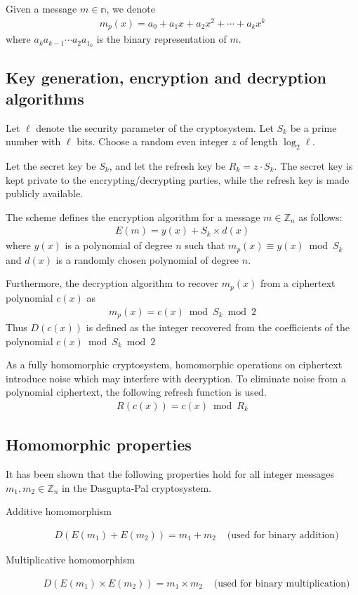 Given a message $m \in \mathbb{n}$, we denote
\begin{align*}
		m_p(x) = a_0 + a_1x + a_2x^2 + \cdots + a_kx^k
\end{align*}
where $a_ka_{k-1}\cdots a_2a_1_0$ is the binary representation of $m$.
\subsection{Key generation, encryption and decryption algorithms}
Let $\ell$ denote the security parameter of the cryptosystem.
Let $S_k$ be a prime number with $\ell$ bits.
Choose a random even integer $z$ of length $\log_2{\ell}$.

Let the secret key be $S_k$, and let the refresh key be $R_k = z \cdot S_k$. The secret key is kept private to the encrypting/decrypting parties, while the refresh key is made publicly available.

The scheme defines the encryption algorithm for a message $m \in \mathbb{Z}_n$ as follows:
\begin{align*}
	E(m) = y(x) + S_k\times d(x)
\end{align*}
where
$y(x)$ is a polynomial of degree $n$ such that $m_p(x) \equiv y(x) \bmod S_k$ and $d(x)$ is a randomly chosen polynomial of degree $n$.

Furthermore, the decryption algorithm to recover $m_p(x)$ from a ciphertext polynomial $c(x)$ as
\begin{align*}
	m_p(x) = c(x) \bmod S_k \bmod 2
\end{align*}
Thus $D(c(x))$ is defined as the integer recovered from the coefficients of the polynomial $c(x) \bmod S_k \bmod 2$

As a fully homomorphic cryptosystem, homomorphic operations on ciphertext introduce noise which may interfere with decryption.
To eliminate noise from a polynomial ciphertext, the following refresh function is used.
\begin{align*}
	R(c(x)) = c(x) \bmod R_k
\end{align*}

\subsection{Homomorphic properties}
It has been shown \cite{dasgupta_design_2016} that the following properties hold for all integer messages $m_1, m_2 \in \mathbb{Z}_n$ in the Dasgupta-Pal cryptosystem.
\begin{description}
  \item[Additive homomorphism]
  \begin{align*}
    D(E(m_1) + E(m_2))= m_1+m_2 & \text{ (used for binary addition)}
  \end{align*}
  \item[Multiplicative homomorphism]
  \begin{align*}
    D(E(m_1) \times E(m_2))= m_1 \times m_2 & \text{ (used for binary multiplication)}
  \end{align*}
\end{description}
